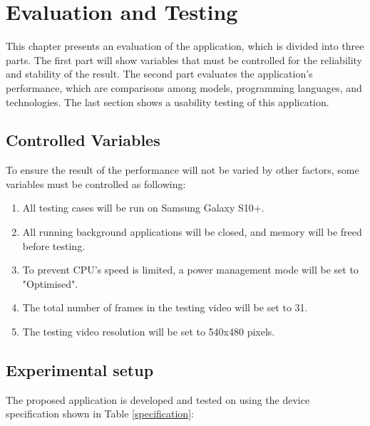 \chapter{Evaluation and Testing}\label{testing}

    This chapter presents an evaluation of the application, which is divided into three parts.
    The first part will show variables that must be controlled for the reliability and stability of the result.
    The second part evaluates the application's performance,
    which are comparisons among models, programming languages, and technologies.
    The last section shows a usability testing of this application.

    \section{Controlled Variables}
        To ensure the result of the performance will not be varied by other factors, some variables must be controlled as following:
        \begin{enumerate}
            \item All testing cases will be run on Samsung Galaxy S10+.
            \item All running background applications will be closed, and memory will be freed before testing.
            \item To prevent CPU's speed is limited, a power management mode will be set to "Optimised".
            \item The total number of frames in the testing video will be set to 31.
            \item The testing video resolution will be set to 540x480 pixels.
        \end{enumerate}

    \section{Experimental setup}
        The proposed application is developed and tested on using the device specification shown in Table \ref{specification}:

